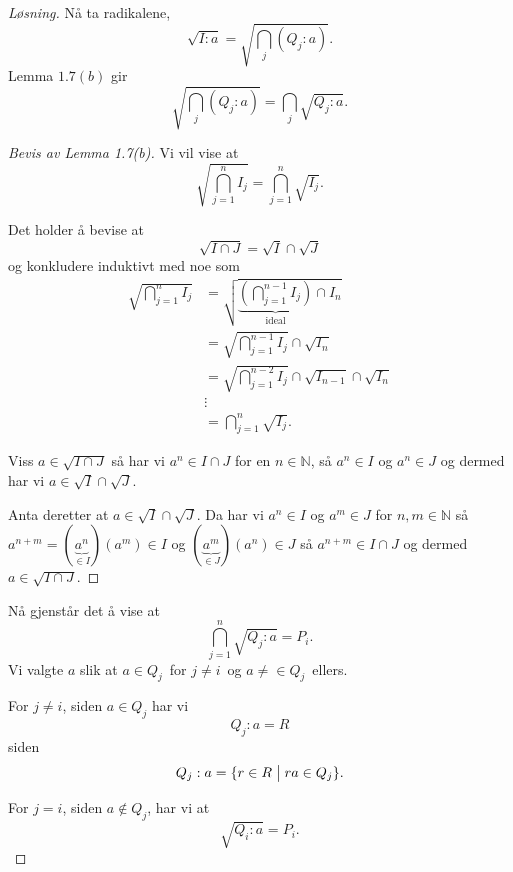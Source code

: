 \documentclass[11pt]{article}
\begin{document}
\begin{proof}[L{\o}sning]
    N{\aa} ta radikalene, 
    \[
        \sqrt{I:a} = \sqrt{\bigcap_j (Q_j : a)}. 
    \]
    Lemma $1.7(b)$ gir 
    \[
        \sqrt{\bigcap_j (Q_j : a)} = 
        \bigcap_j \sqrt{Q_j : a}. 
    \]

    \begin{proof}[Bevis av Lemma 1.7(b)]
        Vi vil vise at 
        \[
            \sqrt{\bigcap_{j=1}^n  I_j} = 
            \bigcap_{j=1}^n \sqrt{I_j}. 
        \]

        Det holder {\aa} bevise at 
        \[
            \sqrt{I \cap J} = \sqrt I \cap \sqrt J 
        \]
        og konkludere induktivt med noe som
        \begin{align*}
            \sqrt{\bigcap_{j=1}^n I_j} 
            &= \sqrt{
            \underbrace{\left(\bigcap_{j=1}^{n-1} I_j \right)}_{\text{ideal}}
            \cap I_n} \\ 
            &= \sqrt{\bigcap_{j=1}^{n-1} I_j} \cap 
            \sqrt{I_n} \\ 
            &= \sqrt{\bigcap_{j=1}^{n-2}I_j} \cap 
            \sqrt{I_{n-1}} \cap \sqrt{I_n} \\ 
            &\vdots \\ 
            &= \bigcap_{j=1}^n \sqrt{I_j}. 
        \end{align*}

        Viss $a \in \sqrt{I \cap J}$ s{\aa} 
        har vi $a^n \in I \cap J$ for en 
        $n \in \mathbb N$, s{\aa} 
        $a^n \in I$ og $a^n \in J$ og dermed 
        har vi $a \in \sqrt{I} \cap \sqrt{J}$. 

        Anta deretter at $a \in \sqrt{I} \cap \sqrt{J}$. 
        Da har vi $a^n \in I$ og $a^m \in J$ for 
        $n,m \in \mathbb N$ s{\aa} 
        $a^{n+m} = (\underbrace{a^n}_{\in I})(a^m) \in I$
        og $(\underbrace{a^m}_{\in J})(a^n) \in J$ s{\aa} 
        $a^{n+m} \in I \cap J$ og dermed 
        $a \in \sqrt{I \cap J}$. 
    \end{proof}

    N{\aa} gjenst{\aa}r det {\aa} vise at 
    \[
        \bigcap_{j=1}^n \sqrt{Q_j : a} = P_i.
    \]
    Vi valgte $a$ slik at $a \in Q_j$ for $j \neq i$ og 
    $a\neq \in Q_j$ ellers. 

    For $j \neq i$, siden $a \in Q_j$ har vi 
    \[
        Q_j : a = R 
    \]
    siden 
    \[
        Q_j : a = \{r \in R \bigm| ra \in Q_j\}. 
    \]

    For $j = i$, siden $a\not\in Q_j$, 
    har vi at 
    \[
        \sqrt{Q_i : a} = P_i.
    \]


\end{proof}
\end{document}
